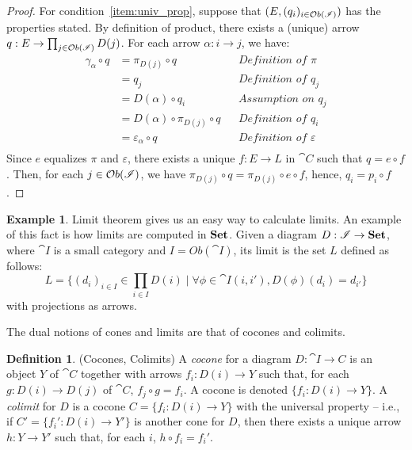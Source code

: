 \documentclass[a4paper, twoside,openright]{report}
\theoremstyle{plain}
\theoremstyle{definition}
\newtheorem{definition}[theorem]{Definition}
\newtheorem{example}[theorem]{Example}
\begin{document}
\begin{proof}
    For condition~\ref{item:univ_prop}, suppose that $(E, (q_i)_{i \in \mathcal{O}b(\mathscr{I})})$ has the properties stated. By definition of product, there exists a (unique) arrow $q: E \rightarrow \prod_{j \in \mathcal{O}b(\mathscr{I})}D(j)$. For each arrow $\alpha: i \rightarrow j$, we have:
    \begin{align*}
            \gamma_\alpha \circ q 
                &= \pi_{D(j)} \circ q           && \textit{Definition of $\pi$} \\
                &= q_j                          && \textit{Definition of $q_j$} \\
                &= D(\alpha) \circ q_i          && \textit{Assumption on $q_j$} \\
                &= D(\alpha) \circ \pi_{D(j)} \circ q   &&\textit{Definition of $q_i$} \\
                &= \varepsilon_{\alpha} \circ q && \textit{Definition of $\varepsilon$} \\
    \end{align*}
    Since $e$ equalizes $\pi$ and $\varepsilon$, there exists a unique $f: E \rightarrow L$ in $\cat C$ such that $q = e \circ f$. Then, for each $j \in \mathcal{O}b(\mathscr{I})$, we have $\pi_{D(j)} \circ q = \pi_{D(j)} \circ e \circ f$, hence, $q_i = p_i \circ f$.
\end{proof}

\begin{example}\label{ex:lim_of_sets}
    Limit theorem gives us an easy way to calculate limits. An example of this fact is how limits are computed in $\mathbf{Set}$. Given a diagram $D: \mathscr{I} \rightarrow \mathbf{Set}$, where $\cat I$ is a small category and $I = Ob(\cat I)$, its limit is the set $L$ defined as follows:
    $$
        L = \{ (d_i)_{i \in I} \in \prod_{i \in I}D(i) \mid \forall \phi \in \cat I(i, i'), D(\phi)(d_i) = d_{i'} \}
    $$
    with projections as arrows.
\end{example}

The dual notions of cones and limits are that of cocones and colimits.

\begin{definition}(Cocones, Colimits)
    A \emph{cocone} for a diagram $D: \cat{I \rightarrow C}$ is an object $Y$ of $\cat C$ together with arrows $f_i : D(i) \rightarrow Y$ such that, for each $g: D(i) \rightarrow D(j)$ of $\cat C$, $f_j \circ g = f_i$. A cocone is denoted $\{f_i: D(i) \rightarrow Y \}$.
    A \emph{colimit} for $D$ is a cocone $C = \{f_i: D(i) \rightarrow Y \}$ with the universal property -- i.e., if $C' = \{ f_i' : D(i) \rightarrow Y'\}$ is another cone for $D$, then there exists a unique arrow $h:Y \rightarrow Y'$ such that, for each $i$, $h \circ f_i = f_i'$.
\end{definition}
\end{document}
